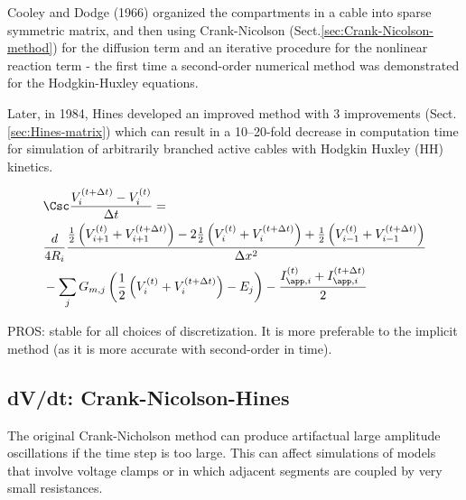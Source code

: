 Cooley and Dodge (1966) organized the compartments in a cable into sparse
symmetric matrix, and then using Crank-Nicolson
(Sect.\ref{sec:Crank-Nicolson-method}) for the diffusion term and an iterative
procedure for the nonlinear reaction term - the first time a second-order
numerical method was demonstrated for the Hodgkin-Huxley equations.

Later, in 1984, Hines developed an improved method with 3 improvements
(Sect.\ref{sec:Hines-matrix}) which can result in a 10–20-fold decrease in
computation time for simulation of arbitrarily branched active cables with
Hodgkin Huxley (HH) kinetics.

\begin{equation}
\begin{split}
  &\Csc \frac{V_i^{(t+\Delta t)} - V_i^{(t)}}{\Delta t} = \\
  &\frac{d}{4R_i}
  \frac{ \frac{1}{2} \left( V_{i+1}^{(t)} + V_{i+1}^{(t + \Delta t)} \right) -
  2\frac{1}{2} \left( V_i^{(t)} + V_i^{(t + \Delta t)} \right) + 
  \frac{1}{2} \left( V_{i-1}^{(t)} + V_{i-1}^{(t +
  \Delta t)} \right) }{\Delta x^2} \\
  &- \sum_j G_{m,j} \left(
  \frac{1}{2}\left( V_{i}^{(t)} + V_{i}^{(t + \Delta t)}\right) - E_j \right)   
  - \frac{I_{\app,i}^{(t)} + I_{\app,i}^{(t+\Delta t)}}{2}
\end{split}
\end{equation}

PROS: stable for all choices of discretization. It is more preferable to the
implicit method (as it is more accurate with second-order in time).


\subsection{dV/dt: Crank-Nicolson-Hines}
\label{sec:Crank-Nicolson-Hines}

The original Crank-Nicholson method can produce artifactual large amplitude
oscillations if the time step is too large. This can affect simulations of
models that involve voltage clamps or in which adjacent segments are coupled by
very small resistances.


